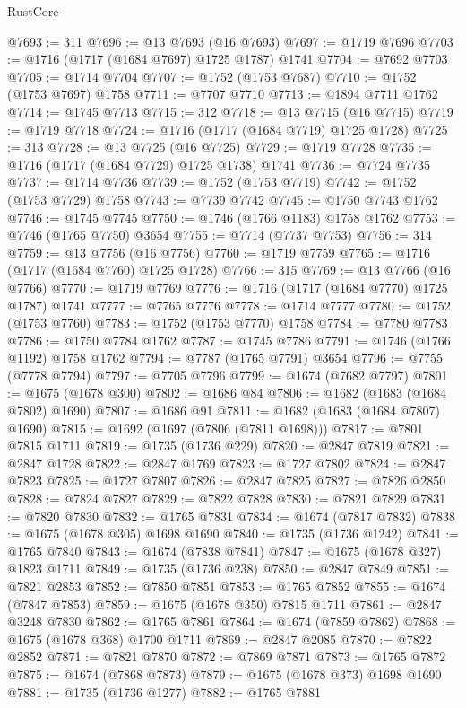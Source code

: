 \begin{lexlean}{RustCore}
\begin{coremodule}
@7693 := 311
@7696 := @13 @7693 (@16 @7693)
@7697 := @1719 @7696
@7703 := @1716 (@1717 (@1684 @7697) @1725 @1787) @1741
@7704 := @7692 @7703
@7705 := @1714 @7704
@7707 := @1752 (@1753 @7687)
@7710 := @1752 (@1753 @7697) @1758
@7711 := @7707 @7710
@7713 := @1894 @7711 @1762
@7714 := @1745 @7713
@7715 := 312
@7718 := @13 @7715 (@16 @7715)
@7719 := @1719 @7718
@7724 := @1716 (@1717 (@1684 @7719) @1725 @1728)
@7725 := 313
@7728 := @13 @7725 (@16 @7725)
@7729 := @1719 @7728
@7735 := @1716 (@1717 (@1684 @7729) @1725 @1738) @1741
@7736 := @7724 @7735
@7737 := @1714 @7736
@7739 := @1752 (@1753 @7719)
@7742 := @1752 (@1753 @7729) @1758
@7743 := @7739 @7742
@7745 := @1750 @7743 @1762
@7746 := @1745 @7745
@7750 := @1746 (@1766 @1183) @1758 @1762
@7753 := @7746 (@1765 @7750) @3654
@7755 := @7714 (@7737 @7753)
@7756 := 314
@7759 := @13 @7756 (@16 @7756)
@7760 := @1719 @7759
@7765 := @1716 (@1717 (@1684 @7760) @1725 @1728)
@7766 := 315
@7769 := @13 @7766 (@16 @7766)
@7770 := @1719 @7769
@7776 := @1716 (@1717 (@1684 @7770) @1725 @1787) @1741
@7777 := @7765 @7776
@7778 := @1714 @7777
@7780 := @1752 (@1753 @7760)
@7783 := @1752 (@1753 @7770) @1758
@7784 := @7780 @7783
@7786 := @1750 @7784 @1762
@7787 := @1745 @7786
@7791 := @1746 (@1766 @1192) @1758 @1762
@7794 := @7787 (@1765 @7791) @3654
@7796 := @7755 (@7778 @7794)
@7797 := @7705 @7796
@7799 := @1674 (@7682 @7797)
@7801 := @1675 (@1678 @300)
@7802 := @1686 @84
@7806 := @1682 (@1683 (@1684 @7802) @1690)
@7807 := @1686 @91
@7811 := @1682 (@1683 (@1684 @7807) @1690)
@7815 := @1692 (@1697 (@7806 (@7811 @1698)))
@7817 := @7801 @7815 @1711
@7819 := @1735 (@1736 @229)
@7820 := @2847 @7819
@7821 := @2847 @1728
@7822 := @2847 @1769
@7823 := @1727 @7802
@7824 := @2847 @7823
@7825 := @1727 @7807
@7826 := @2847 @7825
@7827 := @7826 @2850
@7828 := @7824 @7827
@7829 := @7822 @7828
@7830 := @7821 @7829
@7831 := @7820 @7830
@7832 := @1765 @7831
@7834 := @1674 (@7817 @7832)
@7838 := @1675 (@1678 @305) @1698 @1690
@7840 := @1735 (@1736 @1242)
@7841 := @1765 @7840
@7843 := @1674 (@7838 @7841)
@7847 := @1675 (@1678 @327) @1823 @1711
@7849 := @1735 (@1736 @238)
@7850 := @2847 @7849
@7851 := @7821 @2853
@7852 := @7850 @7851
@7853 := @1765 @7852
@7855 := @1674 (@7847 @7853)
@7859 := @1675 (@1678 @350) @7815 @1711
@7861 := @2847 @3248 @7830
@7862 := @1765 @7861
@7864 := @1674 (@7859 @7862)
@7868 := @1675 (@1678 @368) @1700 @1711
@7869 := @2847 @2085
@7870 := @7822 @2852
@7871 := @7821 @7870
@7872 := @7869 @7871
@7873 := @1765 @7872
@7875 := @1674 (@7868 @7873)
@7879 := @1675 (@1678 @373) @1698 @1690
@7881 := @1735 (@1736 @1277)
@7882 := @1765 @7881

\end{coremodule}
\end{lexlean}
